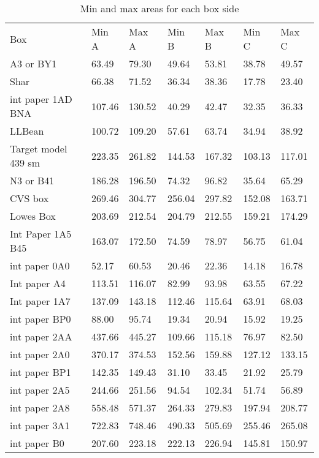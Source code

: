 \documentclass[11pt, twoside, reqno]{book}
\begin{document}
\begin{table}[]
	\centering

	\label{AR2Dl}
	\begin{tabular}{lllllll}
		Box                 & Min A  & Max A  & Min B  & Max B  & Min C  & Max C  \\
		A3 or BY1           & 63.49  & 79.30  & 49.64  & 53.81  & 38.78  & 49.57  \\
		Shar                & 66.38  & 71.52  & 36.34  & 38.36  & 17.78  & 23.40  \\
		int paper 1AD BNA   & 107.46 & 130.52 & 40.29  & 42.47  & 32.35  & 36.33  \\
		LLBean              & 100.72 & 109.20 & 57.61  & 63.74  & 34.94  & 38.92  \\
		Target model 439 sm & 223.35 & 261.82 & 144.53 & 167.32 & 103.13 & 117.01 \\
		N3 or B41           & 186.28 & 196.50 & 74.32  & 96.82  & 35.64  & 65.29  \\
		CVS box             & 269.46 & 304.77 & 256.04 & 297.82 & 152.08 & 163.71 \\
		Lowes Box           & 203.69 & 212.54 & 204.79 & 212.55 & 159.21 & 174.29 \\
		Int Paper 1A5 B45   & 163.07 & 172.50 & 74.59  & 78.97  & 56.75  & 61.04  \\
		int paper 0A0       & 52.17  & 60.53  & 20.46  & 22.36  & 14.18  & 16.78  \\
		Int paper A4        & 113.51 & 116.07 & 82.99  & 93.98  & 63.55  & 67.22  \\
		Int paper 1A7       & 137.09 & 143.18 & 112.46 & 115.64 & 63.91  & 68.03  \\
		int paper BP0       & 88.00  & 95.74  & 19.34  & 20.94  & 15.92  & 19.25  \\
		int paper 2AA       & 437.66 & 445.27 & 109.66 & 115.18 & 76.97  & 82.50  \\
		int paper 2A0       & 370.17 & 374.53 & 152.56 & 159.88 & 127.12 & 133.15 \\
		int paper BP1       & 142.35 & 149.43 & 31.10  & 33.45  & 21.92  & 25.79  \\
		int paper 2A5       & 244.66 & 251.56 & 94.54  & 102.34 & 51.74  & 56.89  \\
		int paper 2A8       & 558.48 & 571.37 & 264.33 & 279.83 & 197.94 & 208.77 \\
		int paper 3A1       & 722.83 & 748.46 & 490.33 & 505.69 & 255.46 & 265.08 \\
		int paper B0        & 207.60 & 223.18 & 222.13 & 226.94 & 145.81 & 150.97
	\end{tabular}
\caption{Min and max areas for each box side}
\end{table}
\end{document}
